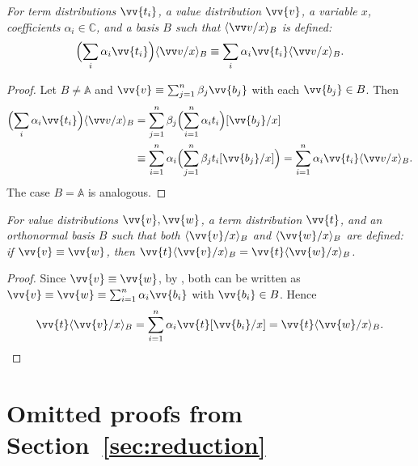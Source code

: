 \documentclass[runningheads,orivec,envcountsame,envcountsect]{llncs}
\newcommand\ansubst[2]{\ensuremath{\langle #1 \rangle_{#2}}}
\newcommand\AbsBasis{\ensuremath{\mathbb{A}}}
\def\C{\mathbb{C}}            %
\begin{document}
\begin{restatelemma}
  \itshape
  For term distributions $\vv{t_i}$, a value distribution $\vv{v}$, a
  variable $x$, coefficients $\alpha_i\in\C$, and a basis $B$ such that
  $\ansubst{\vv v/x}{B}$ is defined:
  \[
    \Bigl(\sum_i \alpha_i\vv{t_i}\Bigr)\ansubst{\vv v/x}{B}
    \equiv
    \sum_i \alpha_i\vv{t_i} \ansubst{\vv v/x}{B}.
  \]
\end{restatelemma}
\begin{proof}
  Let $B\neq\AbsBasis$ and
  $\vv{v}\equiv\sum_{j=1}^n\beta_j\vv{b_j}$ with each $\vv{b_j}\in B$.
  Then
  \begin{align*}
    \Bigl(\sum_i \alpha_i\vv{t_i}\Bigr)\ansubst{\vv v/x}{B}
    &= \sum_{j=1}^n \beta_j\Bigl(\sum_{i=1}^{n}\alpha_i t_i\Bigr)[\vv{b_j}/x]\\
    &\equiv \sum_{i=1}^{n}\alpha_i\Bigl(\sum_{j=1}^n\beta_j t_i[\vv{b_j}/x]\Bigr)
    = \sum_{i=1}^{n}\alpha_i\vv{t_i}\ansubst{\vv v/x}{B}.
  \end{align*}
  The case $B=\AbsBasis$ is analogous.
\end{proof}

\begin{restatelemma}
  \itshape
  For value distributions $\vv{v},\vv{w}$, a term distribution $\vv{t}$, and
  an orthonormal basis $B$ such that both
  $\ansubst{\vv{v}/x}{B}$ and $\ansubst{\vv{w}/x}{B}$ are defined:
  if $\vv{v}\equiv\vv{w}$, then
  $\vv{t}\ansubst{\vv{v}/x}{B}
  =\vv{t}\ansubst{\vv{w}/x}{B}$.
\end{restatelemma}
\begin{proof}
  Since $\vv{v}\equiv\vv{w}$, by
  ,
  both can be written as
  $\vv{v}\equiv\vv{w}\equiv\sum_{i=1}^{n}\alpha_i\vv{b_i}$ with
  $\vv{b_i}\in B$. Hence
  \[
    \vv{t}\ansubst{\vv{v}/x}{B}
    = \sum_{i=1}^{n}\alpha_i\vv{t}[\vv{b_i}/x]
    = \vv{t}\ansubst{\vv{w}/x}{B}.
  \]
\end{proof}

\section{Omitted proofs from Section~\ref{sec:reduction}}\label{sec:appendixB}
\end{document}
